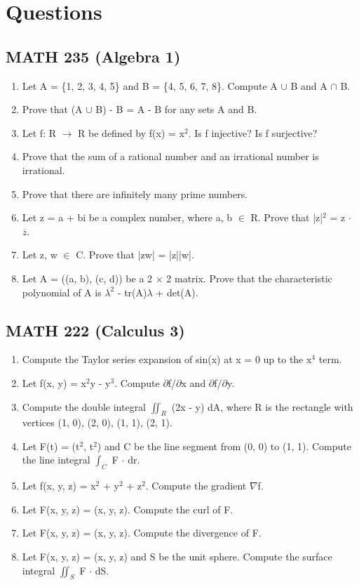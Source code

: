 \documentclass{article}
\begin{document}
\section*{Questions}

\subsection*{MATH 235 (Algebra 1)}

\begin{enumerate}
\item Let A = \{1, 2, 3, 4, 5\} and B = \{4, 5, 6, 7, 8\}. Compute A $\cup$ B and A $\cap$ B.
\item Prove that (A $\cup$ B) - B = A - B for any sets A and B.
\item Let f: R $\to$ R be defined by f(x) = x$^2$. Is f injective? Is f surjective?
\item Prove that the sum of a rational number and an irrational number is irrational.
\item Prove that there are infinitely many prime numbers.
\item Let z = a + bi be a complex number, where a, b $\in$ R. Prove that |z|$^2$ = z $\cdot$ $\overline{z}$.
\item Let z, w $\in$ C. Prove that |zw| = |z||w|.
\item Let A = ((a, b), (c, d)) be a 2 $\times$ 2 matrix. Prove that the characteristic polynomial of A is $\lambda^2$ - tr(A)$\lambda$ + det(A).
\end{enumerate}

\subsection*{MATH 222 (Calculus 3)}

\begin{enumerate}
\item Compute the Taylor series expansion of sin(x) at x = 0 up to the x$^4$ term.
\item Let f(x, y) = x$^2$y - y$^3$. Compute $\partial$f/$\partial$x and $\partial$f/$\partial$y.
\item Compute the double integral $\iint_R$ (2x - y) dA, where R is the rectangle with vertices (1, 0), (2, 0), (1, 1), (2, 1).
\item Let F(t) = (t$^2$, t$^2$) and C be the line segment from (0, 0) to (1, 1). Compute the line integral $\int_C$ F $\cdot$ dr.
\item Let f(x, y, z) = x$^2$ + y$^2$ + z$^2$. Compute the gradient $\nabla$f.
\item Let F(x, y, z) = (x, y, z). Compute the curl of F.
\item Let F(x, y, z) = (x, y, z). Compute the divergence of F.
\item Let F(x, y, z) = (x, y, z) and S be the unit sphere. Compute the surface integral $\iint_S$ F $\cdot$ dS.
\end{enumerate}
\end{document}
